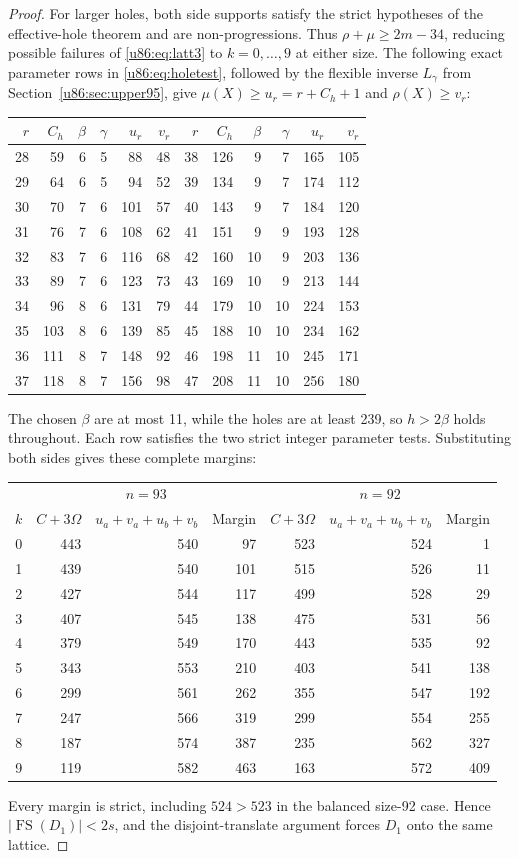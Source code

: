 \documentclass[11pt,a4paper]{article}
\theoremstyle{remark}
\newcommand{\FS}{\operatorname{FS}}
\begin{document}
\begin{proof}
For larger holes, both side supports satisfy the strict hypotheses of
the effective-hole theorem and are non-progressions. Thus
$\rho+\mu\ge2m-34$, reducing possible failures of \eqref{u86:eq:latt3} to
$k=0,\ldots,9$ at either size. The following exact parameter rows in
\eqref{u86:eq:holetest}, followed by the flexible inverse $L_\gamma$ from
Section~\ref{u86:sec:upper95}, give
$\mu(X)\ge u_r=r+C_h+1$ and $\rho(X)\ge v_r$:
\begin{center}\small
\begin{tabular}{rrrrrr@{\qquad}rrrrrr}
\toprule
$r$&$C_h$&$\beta$&$\gamma$&$u_r$&$v_r$&
$r$&$C_h$&$\beta$&$\gamma$&$u_r$&$v_r$\\\midrule
28&59&6&5&88&48&38&126&9&7&165&105\\
29&64&6&5&94&52&39&134&9&7&174&112\\
30&70&7&6&101&57&40&143&9&7&184&120\\
31&76&7&6&108&62&41&151&9&9&193&128\\
32&83&7&6&116&68&42&160&10&9&203&136\\
33&89&7&6&123&73&43&169&10&9&213&144\\
34&96&8&6&131&79&44&179&10&10&224&153\\
35&103&8&6&139&85&45&188&10&10&234&162\\
36&111&8&7&148&92&46&198&11&10&245&171\\
37&118&8&7&156&98&47&208&11&10&256&180\\\bottomrule
\end{tabular}
\end{center}
The chosen $\beta$ are at most 11, while the holes are at least 239, so
$h>2\beta$ holds throughout. Each row satisfies the two strict integer
parameter tests. Substituting both sides gives these complete margins:
\begin{center}\small
\begin{tabular}{r|rrr|rrr}
\toprule
&\multicolumn{3}{c|}{$n=93$}&\multicolumn{3}{c}{$n=92$}\\
$k$&$C+3\Omega$&$u_a+v_a+u_b+v_b$&Margin&
$C+3\Omega$&$u_a+v_a+u_b+v_b$&Margin\\\midrule
0&443&540&97&523&524&1\\
1&439&540&101&515&526&11\\
2&427&544&117&499&528&29\\
3&407&545&138&475&531&56\\
4&379&549&170&443&535&92\\
5&343&553&210&403&541&138\\
6&299&561&262&355&547&192\\
7&247&566&319&299&554&255\\
8&187&574&387&235&562&327\\
9&119&582&463&163&572&409\\\bottomrule
\end{tabular}
\end{center}
Every margin is strict, including $524>523$ in the balanced size-92
case. Hence $|\FS(D_1)|<2s$, and the disjoint-translate argument forces
$D_1$ onto the same lattice.


\end{proof}
\end{document}
